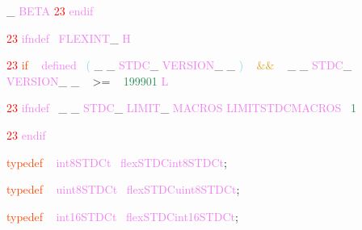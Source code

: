 \documentclass[8, usernames, dvipsnames]{beamer}
\begin{document}
\begin{frame}
\textcolor{Sepia}{\_}
\textcolor{Violet}{BETA}
  \textcolor{Red}{23}
\textcolor{Violet}{endif}
 
 
 
 
 
 
 
 
 \end{frame}
\begin{frame}

 
 
 
 
  \textcolor{Red}{23}
\textcolor{Violet}{ifndef}\textcolor{White}{\ }
\textcolor{Violet}{FLEXINT}\textcolor{Sepia}{\_}
\textcolor{Violet}{H}
 
 
 
  \textcolor{Red}{23}
\textcolor{OrangeRed}{if}
\textcolor{White}{\ }
\textcolor{Violet}{defined}\textcolor{White}{\ }
\textcolor{SkyBlue}{(}
\textcolor{Sepia}{\_}
\textcolor{Sepia}{\_}
\textcolor{Violet}{STDC}\textcolor{Sepia}{\_}
\textcolor{Violet}{VERSION}\textcolor{Sepia}{\_}
\textcolor{Sepia}{\_}
\textcolor{SkyBlue}{)}
\textcolor{White}{\ }
\textcolor{Goldenrod}{ \&\& }
\textcolor{White}{\ }
\textcolor{Sepia}{\_}
\textcolor{Sepia}{\_}
\textcolor{Violet}{STDC}\textcolor{Sepia}{\_}
\textcolor{Violet}{VERSION}\textcolor{Sepia}{\_}
\textcolor{Sepia}{\_}
\textcolor{White}{\ }
\textcolor{OliveGreen}{\textgreater =}
\textcolor{White}{\ }
\textcolor{SeaGreen}{199901}
\textcolor{Violet}{L}
 \end{frame}
\begin{frame}

 
  \textcolor{Red}{23}
\textcolor{Violet}{ifndef}\textcolor{White}{\ }
\textcolor{Sepia}{\_}
\textcolor{Sepia}{\_}
\textcolor{Violet}{STDC}\textcolor{Sepia}{\_}
\textcolor{Violet}{LIMIT}\textcolor{Sepia}{\_}
\textcolor{Violet}{MACROS}
 \textcolor{Violet}{LIMITSTDCMACROS}\textcolor{White}{\ }
\textcolor{SeaGreen}{1}

  \textcolor{Red}{23}
\textcolor{Violet}{endif}
 
 
 \textcolor{OrangeRed}{typedef}
\textcolor{White}{\ }
\textcolor{Violet}{int8STDCt}\textcolor{White}{\ }
\textcolor{Violet}{flexSTDCint8STDCt}\textcolor{Sepia}{;}

 \textcolor{OrangeRed}{typedef}
\textcolor{White}{\ }
\textcolor{Violet}{uint8STDCt}\textcolor{White}{\ }
\textcolor{Violet}{flexSTDCuint8STDCt}\textcolor{Sepia}{;}

 \textcolor{OrangeRed}{typedef}
\textcolor{White}{\ }
\textcolor{Violet}{int16STDCt}\textcolor{White}{\ }
\textcolor{Violet}{flexSTDCint16STDCt}\textcolor{Sepia}{;}

 \end{frame}
\end{document}

